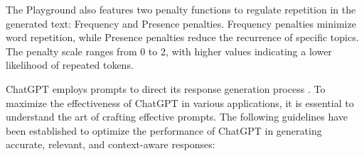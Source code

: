 The Playground also features two penalty functions to regulate repetition in the generated text: Frequency and Presence penalties. Frequency penalties minimize word repetition, while Presence penalties reduce the recurrence of specific topics. The penalty scale ranges from 0 to 2, with higher values indicating a lower likelihood of repeated tokens.


ChatGPT employs prompts to direct its response generation process \cite{white2023prompt}.
To maximize the effectiveness of ChatGPT in various applications, it is essential to understand the art of crafting effective prompts. The following guidelines have been established to optimize the performance of ChatGPT in generating accurate, relevant, and context-aware responses:


